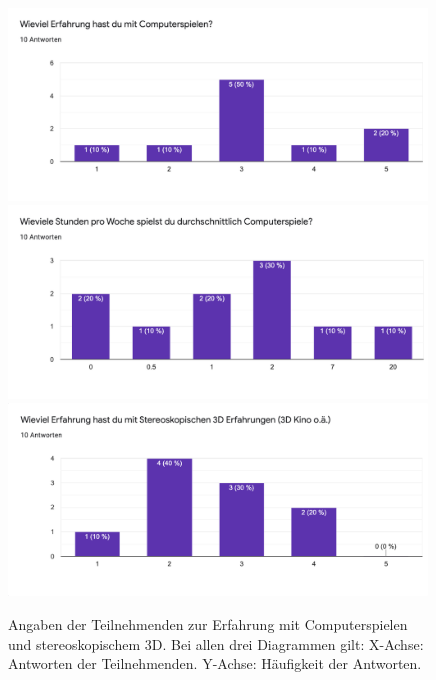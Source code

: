         \begin{figure}[H]
            \centering
            \includegraphics[width=0.99\textwidth]{images/erfahrungpc.png}
            \includegraphics[width=0.99\textwidth]{images/pcstundenprowoche.png}
            \includegraphics[width=0.99\textwidth]{images/3derfahrung.png}
            \caption{Angaben der Teilnehmenden zur Erfahrung mit Computerspielen und stereoskopischem 3D. Bei allen drei Diagrammen gilt:
            X-Achse: Antworten der Teilnehmenden. Y-Achse: Häufigkeit der Antworten.}\label{figure:videogames}
        \end{figure}

